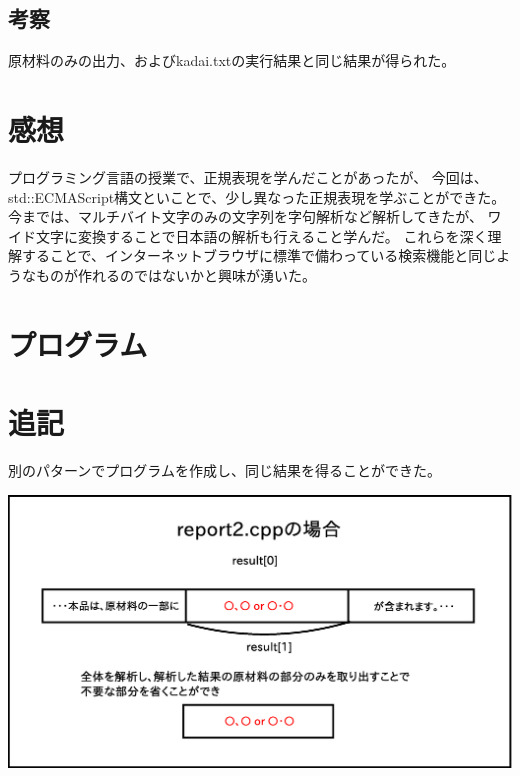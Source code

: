 \documentclass[a4j]{jarticle}
\begin{document}
\subsection{考察}
原材料のみの出力、およびkadai.txtの実行結果と同じ結果が得られた。

\section{感想}
プログラミング言語の授業で、正規表現を学んだことがあったが、
今回は、std::ECMAScript構文といことで、少し異なった正規表現を学ぶことができた。
今までは、マルチバイト文字のみの文字列を字句解析など解析してきたが、
ワイド文字に変換することで日本語の解析も行えること学んだ。
これらを深く理解することで、インターネットブラウザに標準で備わっている検索機能と同じようなものが作れるのではないかと興味が湧いた。

\newpage
\section{プログラム}

\section{追記}
別のパターンでプログラムを作成し、同じ結果を得ることができた。
\\
\centerline{\includegraphics[width=15cm]{dia2.eps}}
\\

\end{document}
